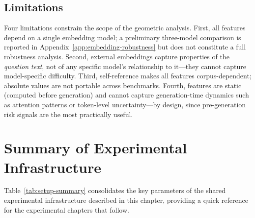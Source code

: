 \subsection{Limitations}
\label{sec:embedding-limitations}

Four limitations constrain the scope of the geometric analysis. First, all features depend on a single embedding model; a preliminary three-model comparison is reported in Appendix~\ref{app:embedding-robustness} but does not constitute a full robustness analysis. Second, external embeddings capture properties of the \emph{question text}, not of any specific model's relationship to it---they cannot capture model-specific difficulty. Third, self-reference makes all features corpus-dependent; absolute values are not portable across benchmarks. Fourth, features are static (computed before generation) and cannot capture generation-time dynamics such as attention patterns or token-level uncertainty---by design, since pre-generation risk signals are the most practically useful.

\section{Summary of Experimental Infrastructure}
\label{sec:setup-summary}

Table~\ref{tab:setup-summary} consolidates the key parameters of the shared experimental infrastructure described in this chapter, providing a quick reference for the experimental chapters that follow.

